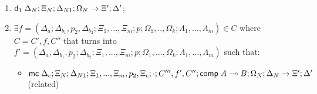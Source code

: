 \begin{theorem}
\begin{itemize}
\begin{enumerate}
   \item $\mathsf{d}_1 \; \Delta_N; \Xi_N; \Delta_{N1}; \Omega_N \rightarrow \Xi'; \Delta'$;
   \item $\exists f = (\Delta_a; \Delta_{b_1}, p_2, \Delta_{b_2}; \Xi_1, ..., \Xi_m; p; \Omega_1, .., \Omega_k; \Lambda_1, ..., \Lambda_m) \in C$ where $C= C', f, C''$ that turns into $f' = (\Delta_a, \Delta_{b_1}, p_2; \Delta_{b_2}; \Xi_1, ..., \Xi_m; p; \Omega_1, ..., \Omega_k; \Lambda_1, ..., \Lambda_m)$ such that:
   \begin{itemize}
      \item $\mathsf{mc} \; \Delta_c; \Xi_N; \Delta_{N1}; \Xi_1, ..., \Xi_m, p_2, \Xi_c; \cdot; C''', f', C''; \mathsf{comp} \; A \multimap B; \Omega_N; \Delta_N \rightarrow \Xi'; \Delta'$ (related)
   \end{itemize}
\end{enumerate}
\end{itemize}
\end{theorem}

